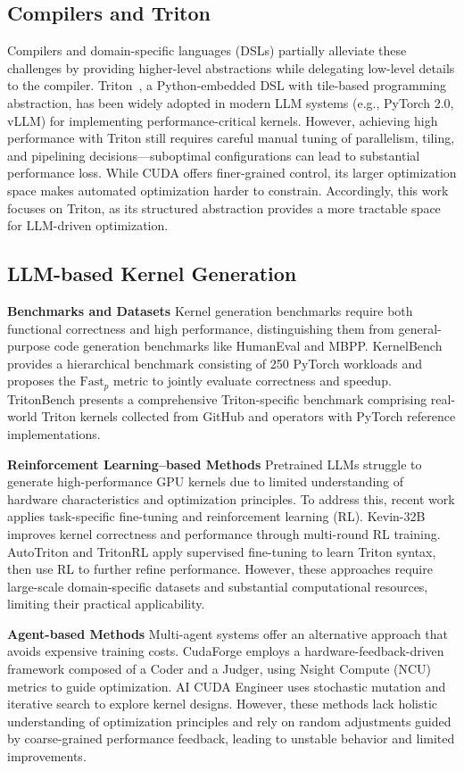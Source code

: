 \documentclass{article}
\theoremstyle{plain}
\theoremstyle{definition}
\theoremstyle{remark}
\begin{document}
\subsection{Compilers and Triton}
Compilers and domain-specific languages (DSLs) partially alleviate these challenges by providing higher-level abstractions while delegating low-level details to the compiler. Triton~\cite{triton}, a Python-embedded DSL with tile-based programming abstraction, has been widely adopted in modern LLM systems (e.g., PyTorch 2.0, vLLM) for implementing performance-critical kernels. However, achieving high performance with Triton still requires careful manual tuning of parallelism, tiling, and pipelining decisions—suboptimal configurations can lead to substantial performance loss. While CUDA offers finer-grained control, its larger optimization space makes automated optimization harder to constrain. Accordingly, this work focuses on Triton, as its structured abstraction provides a more tractable space for LLM-driven optimization.

\subsection{LLM-based Kernel Generation}
\textbf{Benchmarks and Datasets} Kernel generation benchmarks require both functional correctness and high performance, distinguishing them from general-purpose code generation benchmarks like HumanEval and MBPP. KernelBench provides a hierarchical benchmark consisting of 250 PyTorch workloads and proposes the $\mathrm{Fast}_p$ metric to jointly evaluate correctness and speedup. TritonBench presents a comprehensive Triton-specific benchmark comprising real-world Triton kernels collected from GitHub and operators with PyTorch reference implementations.

\textbf{Reinforcement Learning–based Methods} Pretrained LLMs struggle to generate high-performance GPU kernels due to limited understanding of hardware characteristics and optimization principles. To address this, recent work applies task-specific fine-tuning and reinforcement learning (RL). Kevin-32B improves kernel correctness and performance through multi-round RL training. AutoTriton and TritonRL apply supervised fine-tuning to learn Triton syntax, then use RL to further refine performance. However, these approaches require large-scale domain-specific datasets and substantial computational resources, limiting their practical applicability.

\textbf{Agent-based Methods} Multi-agent systems offer an alternative approach that avoids expensive training costs. CudaForge employs a hardware-feedback-driven framework composed of a Coder and a Judger, using Nsight Compute (NCU) metrics to guide optimization. AI CUDA Engineer uses stochastic mutation and iterative search to explore kernel designs. 
However, these methods lack holistic understanding of optimization principles and rely on random adjustments guided by coarse-grained performance feedback, leading to unstable behavior and limited improvements.
\end{document}
